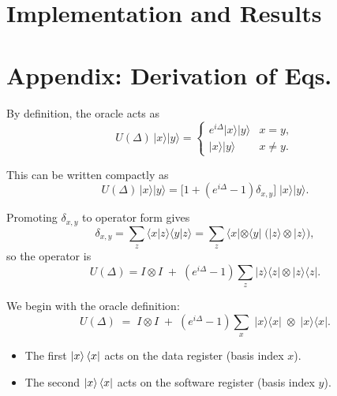 \documentclass[12pt,a4paper]{article}
\begin{document}
\clearpage
\newpage
\section{Implementation and Results}


\clearpage
\appendix
\section*{Appendix: Derivation of Eqs.}

By definition, the oracle acts as
\begin{equation}
U(\Delta)\,|x\rangle|y\rangle =
\begin{cases}
e^{i\Delta}|x\rangle|y\rangle & x=y, \\[6pt]
|x\rangle|y\rangle & x\neq y .
\end{cases}
\end{equation}

This can be written compactly as
\begin{equation}
U(\Delta)\,|x\rangle|y\rangle =
\Big[1+(e^{i\Delta}-1)\delta_{x,y}\Big]\;|x\rangle|y\rangle .
\end{equation}

Promoting $\delta_{x,y}$ to operator form gives
\begin{equation}
\delta_{x,y} = \sum_{z} 
\langle x|z\rangle\langle y|z\rangle 
= \sum_{z} \langle x|\otimes \langle y| \;
\big(|z\rangle\otimes|z\rangle\big),
\end{equation}
so the operator is
\begin{equation}
U(\Delta) = I\otimes I \;+\; (e^{i\Delta}-1)\sum_{z} |z\rangle\langle z|\otimes|z\rangle\langle z| .
\end{equation}
\setlength{\parskip}{1em}


We begin with the oracle definition:
\begin{equation}
U(\Delta) \;=\; I \otimes I \;+\; (e^{i\Delta}-1)\sum_{x} \;|x\rangle\langle x|\;\otimes\;|x\rangle\langle x| .
\end{equation}
\begin{itemize}
    \item The first $\ket{x}\bra{x}$ acts on the data register (basis index $x$).
    \item The second $\ket{x}\bra{x}$ acts on the software register (basis index $y$).
\end{itemize}

\setlength{\parskip}{1em}
\end{document}
